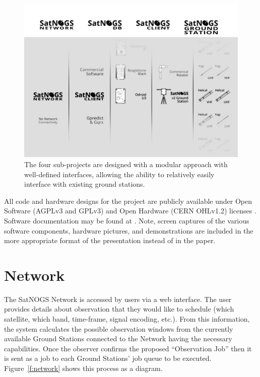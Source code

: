 \documentclass[conference,letterpaper,12pt]{IEEEtran}
\newcommand{\figref}[1]{Figure~\ref{#1}}
\newlength{\imgwidth}
\begin{document}
\begin{figure}[b]
\centering
\includegraphics[width=\imgwidth]{fig/components-modular}%
\caption{The four sub-projects are designed with a modular approach with well-defined interfaces, allowing the ability to relatively easily interface with existing ground stations.}
\label{f:modular}
\end{figure}

All code and hardware designs for the project are publicly available under Open Software (AGPLv3 and GPLv3) and Open Hardware (CERN OHLv1.2) licenses \cite{SatNOGS-github}.
Software documentation may be found at \cite{SatNOGS-docs}.
Note, screen captures of the various software components, hardware pictures, and demonstrations are included in the more appropriate format of the presentation instead of in the paper.


\section{Network}
The SatNOGS Network is accessed by users via a web interface.
The user provides details about observation that they would like to schedule (which satellite, which band, time-frame, signal encoding, etc.).
From this information, the system calculates the possible observation windows from the currently available Ground Stations connected to the Network having the necessary capabilities.
Once the observer confirms the proposed ``Observation Job'' then it is sent as a job to each Ground Stations' job queue to be executed.
\figref{f:network} shows this process as a diagram.
\end{document}
